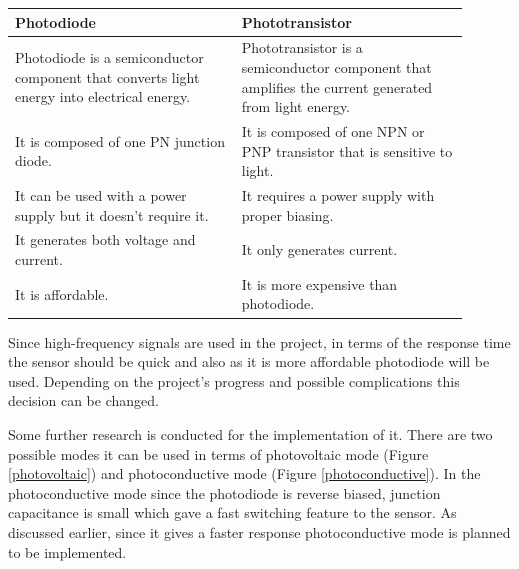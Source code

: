 \documentclass[a4paper,10pt]{IEEEtran}
\begin{document}
\begin{table}[htbp!]
    \begin{tabular}{|p{0.45\linewidth}|p{0.45\linewidth}|}
    \hline
    \textbf{Photodiode}                                                         & \textbf{Phototransistor}                                                                \\ \hline
    Photodiode is   a semiconductor component that converts light energy into electrical energy. & Phototransistor   is a semiconductor component that amplifies the current generated from light   energy. \\ \hline
    It is composed   of one PN junction diode.                                                   & It is composed   of one NPN or PNP transistor that is sensitive to light.                                \\ \hline
    It can be   used with a power supply but it doesn’t require it.                              & It requires a   power supply with proper biasing.                                                        \\ \hline
    It generates   both voltage and current.                                                     & It only   generates current.                                                                             \\ \hline
    It is affordable.                                                                            & It is more   expensive than photodiode.                                                                  \\ \hline
    \end{tabular}
    \label{table1}
\end{table}




Since high-frequency signals are used in the project, in terms of the response time the sensor should be quick and also as it is more affordable photodiode will be used. Depending on the project's progress and possible complications this decision can be changed. 

Some further research is conducted for the implementation of it. There are two possible modes it can be used in terms of photovoltaic mode (Figure \ref{photovoltaic}) and photoconductive mode (Figure \ref{photoconductive}).  In the photoconductive mode since the photodiode is reverse biased, junction capacitance is small which gave a fast switching feature to the sensor. As discussed earlier, since it gives a faster response photoconductive mode is planned to be implemented.
\end{document}
